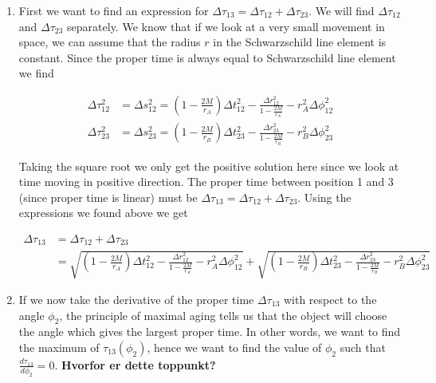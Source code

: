\documentclass[a4paper,10pt,english]{article}
\begin{document}
\begin{enumerate}

\item First we want to find an expression for $\Delta\tau_{13}=\Delta\tau_{12}+\Delta\tau_{23}$. We will find $\Delta\tau_{12}$ and $\Delta\tau_{23}$ separately. We know that if we look at a very small movement in space, we can assume that the radius $r$ in the Schwarzschild line element is constant. Since the proper time is always equal to Schwarzschild line element we find

\begin{align*}
\Delta \tau_{12}^{2}&=\Delta s_{12}^{2}=\left(1-\frac{2M}{r_{A}}\right)\Delta t_{12}^{2}-\frac{\Delta r_{12}^{2}}{1-\frac{2M}{r_{A}}}-r_{A}^{2}\Delta \phi_{12}^{2}\\
\Delta \tau_{23}^{2}&=\Delta s_{23}^{2}=\left(1-\frac{2M}{r_{B}}\right)\Delta t_{23}^{2}-\frac{\Delta r_{23}^{2}}{1-\frac{2M}{r_{B}}}-r_{B}^{2}\Delta \phi_{23}^{2}
\end{align*}

Taking the square root we only get the positive solution here since we look at time moving in positive direction. The proper time between position 1 and 3 (since proper time is linear) must be $\Delta \tau_{13}=\Delta \tau_{12}+\Delta \tau_{23}$. Using the expressions we found above we get

\begin{align*}
\Delta \tau_{13}&=\Delta \tau_{12}+\Delta \tau_{23}\\
&=\sqrt{\left(1-\frac{2M}{r_{A}}\right)\Delta t_{12}^{2}-\frac{\Delta r_{12}^{2}}{1-\frac{2M}{r_{A}}}-r_{A}^{2}\Delta \phi_{12}^{2}}+\sqrt{\left(1-\frac{2M}{r_{B}}\right)\Delta t_{23}^{2}-\frac{\Delta r_{23}^{2}}{1-\frac{2M}{r_{B}}}-r_{B}^{2}\Delta \phi_{23}^{2}}
\end{align*}

\item If we now take the derivative of the proper time $\Delta \tau_{13}$ with respect to the angle $\phi_{2}$, the principle of maximal aging tells us that the object will choose the angle which gives the largest proper time. In other words, we want to find the maximum of $\tau_{13}(\phi_{2})$, hence we want to find the value of $\phi_{2}$ such that $\frac{d\tau_{13}}{d\phi_{2}}=0$. \textbf{Hvorfor er dette toppunkt?}%


\end{enumerate}
\end{document}
